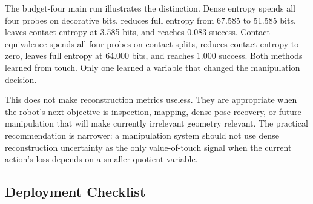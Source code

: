 \documentclass{article}
\begin{document}
\begin{table}[h]
\centering
\caption{Interpretation of the main metrics. Low full entropy is not always necessary, while low contact entropy is necessary for the current manipulation decision.}
\label{tab:metricinterpretation}
\end{table}

The budget-four main run illustrates the distinction. Dense entropy spends all four probes on decorative bits, reduces full entropy from 67.585 to 51.585 bits, leaves contact entropy at 3.585 bits, and reaches 0.083 success. Contact-equivalence spends all four probes on contact splits, reduces contact entropy to zero, leaves full entropy at 64.000 bits, and reaches 1.000 success. Both methods learned from touch. Only one learned a variable that changed the manipulation decision.

This does not make reconstruction metrics useless. They are appropriate when the robot's next objective is inspection, mapping, dense pose recovery, or future manipulation that will make currently irrelevant geometry relevant. The practical recommendation is narrower: a manipulation system should not use dense reconstruction uncertainty as the only value-of-touch signal when the current action's loss depends on a smaller quotient variable.

\subsection{Deployment Checklist}
\end{document}
